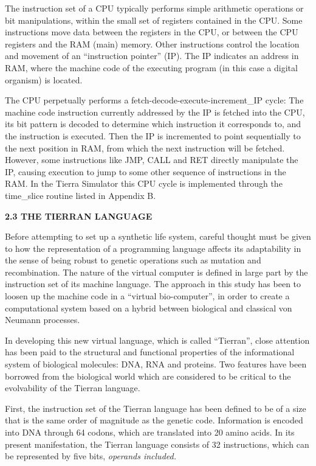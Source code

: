 The instruction set of a CPU typically performs simple arithmetic
operations or bit manipulations, within the small set of registers contained
in the CPU.  Some instructions move data between the registers in the CPU,
or between the CPU registers and the RAM (main) memory.  Other instructions
control the location and movement of an ``instruction pointer'' (IP).  The
IP indicates an address in RAM, where the machine code
of the executing program (in this case a digital organism) is located.

The CPU perpetually performs a fetch-decode-execute-increment\_IP
cycle:  The machine code instruction currently addressed by the IP
is fetched into the CPU, its bit pattern is decoded to determine which
instruction it corresponds to, and the instruction is executed.  Then
the IP is incremented to point sequentially to the next position in RAM,
from which the next instruction will be fetched.  However, some instructions
like JMP, CALL and RET directly manipulate the IP, causing execution to
jump to some other sequence of instructions in the RAM.  In the Tierra
Simulator this CPU cycle is implemented through the time\_slice routine
listed in Appendix B.  

\LP
\bf 2.3 THE TIERRAN LANGUAGE\rm
\eLP

Before attempting to set up a synthetic life system, careful thought must
be given to how the representation of a programming language affects its
adaptability in the sense of being robust to genetic operations such as
mutation and recombination.  The nature of the virtual computer is defined
in large part by the instruction set of its machine language.  The approach
in this study has been to loosen up the machine code in a ``virtual
bio-computer'', in order to create a computational system based on a hybrid
between biological and classical von Neumann processes.

In developing this new virtual language, which is called ``Tierran'', close
attention has been paid to the structural and functional properties of the
informational system of biological molecules: DNA, RNA and proteins.  Two
features have been borrowed from the biological world which are considered
to be critical to the evolvability of the Tierran language.

First, the instruction set of the Tierran language has been defined to be
of a size that is the same order of magnitude as the genetic
code.  Information is encoded into DNA through 64 codons, which are
translated into 20 amino acids.  In its present manifestation, the Tierran
language consists of 32 instructions, which can be represented by five bits,
\it operands included\rm.

